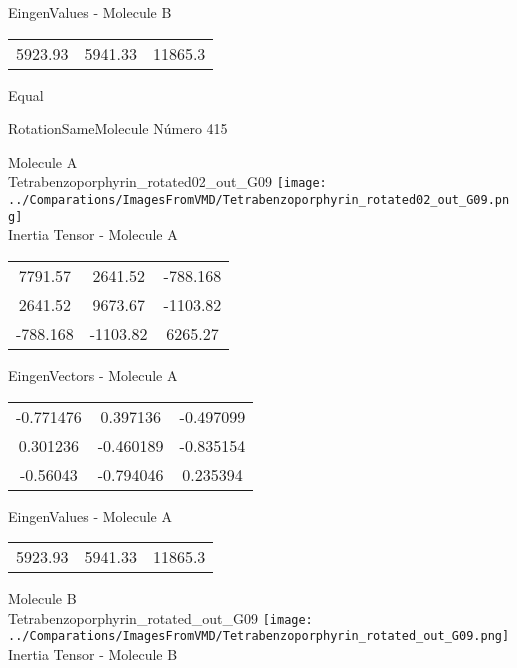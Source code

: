\begin{multicols}{2}
\begin{center}
\vtab
 EingenValues - Molecule B     \\
\vtab
\begin{tabular}{|c c c|}
5923.93	 & 	5941.33	 & 	11865.3	 \\
\end{tabular}

\end{center}
\end{multicols}
\begin{center}
\vtab
\vtab
\textcolor{NavyBlue}{\Large Equal}
\end{center}

 \newpage

\vtab[-2cm]
\begin{center}
{\large RotationSameMolecule \tab Número 415}
\end{center}
\begin{multicols}{2}
\begin{center}

Molecule A \\ 
Tetrabenzoporphyrin\_rotated02\_out\_G09
\texttt{[image: ../Comparations/ImagesFromVMD/Tetrabenzoporphyrin\_rotated02\_out\_G09.png]}
\\
Inertia Tensor - Molecule A \\
\vtab

\begin{tabular}{|c c c|}
7791.57	 & 	2641.52	 & 	-788.168	 \\
2641.52	 & 	9673.67	 & 	-1103.82	 \\
-788.168	 & 	-1103.82	 & 	6265.27
\end{tabular}

\vtab
 EingenVectors - Molecule A     \\
\vtab
\begin{tabular}{|c c c|}
-0.771476	 & 	0.397136	 & 	-0.497099	 \\
0.301236	 & 	-0.460189	 & 	-0.835154	 \\
-0.56043	 & 	-0.794046	 & 	0.235394
\end{tabular}

\vtab
 EingenValues - Molecule A     \\
\vtab
\begin{tabular}{|c c c|}
5923.93	 & 	5941.33	 & 	11865.3	 \\
\end{tabular}
\columnbreak

Molecule B \\ 
Tetrabenzoporphyrin\_rotated\_out\_G09
\texttt{[image: ../Comparations/ImagesFromVMD/Tetrabenzoporphyrin\_rotated\_out\_G09.png]}
\\
Inertia Tensor - Molecule B \\
\vtab


\end{center}
\end{multicols}
